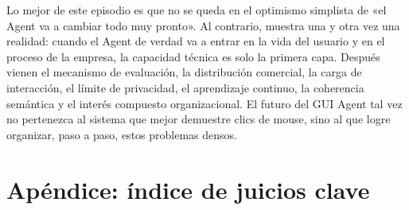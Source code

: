 \documentclass[a4paper]{article}
\begin{document}
Lo mejor de este episodio es que no se queda en el optimismo simplista de «el Agent va a cambiar todo muy pronto». Al contrario, muestra una y otra vez una realidad: cuando el Agent de verdad va a entrar en la vida del usuario y en el proceso de la empresa, la capacidad técnica es solo la primera capa. Después vienen el mecanismo de evaluación, la distribución comercial, la carga de interacción, el límite de privacidad, el aprendizaje continuo, la coherencia semántica y el interés compuesto organizacional. El futuro del GUI Agent tal vez no pertenezca al sistema que mejor demuestre clics de mouse, sino al que logre organizar, paso a paso, estos problemas densos.
\section*{Apéndice: índice de juicios clave}
\end{document}
